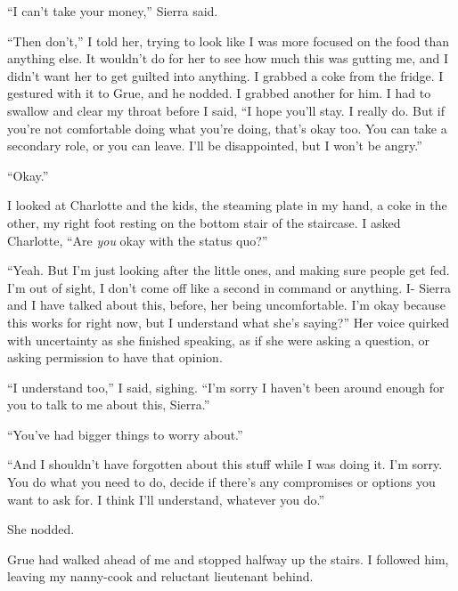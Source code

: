 ``I can't take your money,'' Sierra said.



``Then don't,'' I told her, trying to look like I was more focused on the food than anything else.  It wouldn't do for her to see how much this was gutting me, and I didn't want her to get guilted into anything.  I grabbed a coke from the fridge.  I gestured with it to Grue, and he nodded.  I grabbed another for him.  I had to swallow and clear my throat before I said, ``I hope you'll stay.  I really do.  But if you're not comfortable doing what you're doing, that's okay too.  You can take a secondary role, or you can leave.  I'll be disappointed, but I won't be angry.''



``Okay.''



I looked at Charlotte and the kids, the steaming plate in my hand, a coke in the other, my right foot resting on the bottom stair of the staircase.  I asked Charlotte, ``Are \emph{you} okay with the status quo?''



``Yeah.  But I'm just looking after the little ones, and making sure people get fed.  I'm out of sight, I don't come off like a second in command or anything.  I- Sierra and I have talked about this, before, her being uncomfortable.  I'm okay because this works for right now, but I understand what she's saying?''  Her voice quirked with uncertainty as she finished speaking, as if she were asking a question, or asking permission to have that opinion.



``I understand too,'' I said, sighing.  ``I'm sorry I haven't been around enough for you to talk to me about this, Sierra.''



``You've had bigger things to worry about.''



``And I shouldn't have forgotten about this stuff while I was doing it.  I'm sorry.  You do what you need to do, decide if there's any compromises or options you want to ask for.  I think I'll understand, whatever you do.''



She nodded.



Grue had walked ahead of me and stopped halfway up the stairs.  I followed him, leaving my nanny-cook and reluctant lieutenant behind.



